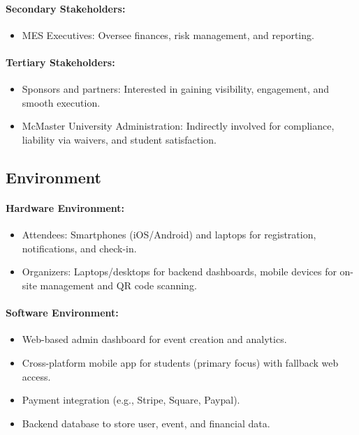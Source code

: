 \documentclass{article}
\begin{document}
\paragraph{Secondary Stakeholders:}
\begin{itemize}
    \item MES Executives: Oversee finances, risk management, and reporting.
\end{itemize}

\paragraph{Tertiary Stakeholders:}
\begin{itemize}
    \item Sponsors and partners: Interested in gaining visibility, engagement, and smooth execution.
    \item McMaster University Administration: Indirectly involved for compliance, liability via waivers,
     and student satisfaction.
\end{itemize}

\subsection{Environment}
\paragraph{Hardware Environment:}
\begin{itemize}
    \item Attendees: Smartphones (iOS/Android) and laptops for registration, notifications, and check-in.
    \item Organizers: Laptops/desktops for backend dashboards, mobile devices for on-site management and QR code scanning.
\end{itemize}

\paragraph{Software Environment:}
\begin{itemize}
    \item Web-based admin dashboard for event creation and analytics.
    \item Cross-platform mobile app for students (primary focus) with fallback web access.
    \item Payment integration (e.g., Stripe, Square, Paypal).
    \item Backend database to store user, event, and financial data.
\end{itemize}
\end{document}
